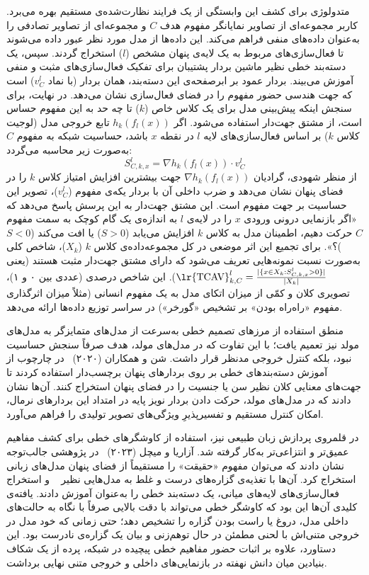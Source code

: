 متدولوژی  برای کشف این وابستگی از یک فرایند نظارت‌شده‌ی مستقیم بهره می‌برد. کاربر مجموعه‌ای از تصاویر نمایانگر مفهوم هدف $C$ و مجموعه‌ای از تصاویر تصادفی را به‌عنوان داده‌های منفی فراهم می‌کند. این داده‌ها از مدل مورد نظر عبور داده می‌شوند تا فعال‌سازی‌های مربوط به یک لایه‌ی پنهان مشخص ($l$) استخراج گردند. سپس، یک دسته‌بند خطی نظیر ماشین بردار پشتیبان برای تفکیک فعال‌سازی‌های مثبت و منفی آموزش می‌بیند. بردار عمود بر ابرصفحه‌ی این دسته‌بند، همان بردار  (با نماد $v_C^l$) است که جهت هندسی حضور مفهوم را در فضای فعال‌سازی نشان می‌دهد. در نهایت، برای سنجش اینکه پیش‌بینی مدل برای یک کلاس خاص ($k$) تا چه حد به این مفهوم حساس است، از مشتق جهت‌دار استفاده می‌شود. اگر $h_k(f_l(x))$ تابع خروجی مدل (لوجیت کلاس $k$) بر اساس فعال‌سازی‌های لایه $l$ در نقطه $x$ باشد، حساسیت شبکه به مفهوم $C$ به‌صورت زیر محاسبه می‌گردد:
\begin{equation}\label{eq:chap3_tcav}
    S_{C,k,x}^l = \nabla h_k(f_l(x)) \cdot v_C^l
\end{equation}
از منظر شهودی، گرادیان $\nabla h_k(f_l(x))$ جهت بیشترین افزایش امتیاز کلاس $k$ را در فضای پنهان نشان می‌دهد و ضرب داخلی آن با بردار یکه‌ی مفهوم ($v_C^l$)، تصویر این حساسیت بر جهت مفهوم است. این مشتق جهت‌دار به این پرسش پاسخ می‌دهد که «اگر بازنمایی درونی ورودی $x$ را در لایه‌ی $l$ به اندازه‌ی یک گام کوچک به سمت مفهوم $C$ حرکت دهیم، اطمینان مدل به کلاس $k$ افزایش می‌یابد ($S > 0$) یا افت می‌کند ($S < 0$)؟». برای تجمیع این اثر موضعی در کل مجموعه‌داده‌ی کلاس $k$ ($X_k$)، شاخص کلی  به‌صورت نسبت نمونه‌هایی تعریف می‌شود که دارای مشتق جهت‌دار مثبت هستند (یعنی $\text{\lr{TCAV}}_{k,C}^l = \frac{|\{x \in X_k : S_{C,k,x}^l > 0\}|}{|X_k|}$). این شاخص درصدی (عددی بین ۰ و ۱)، تصویری کلان و کمّی از میزان اتکای مدل به یک مفهوم انسانی (مثلاً میزان اثرگذاری مفهوم «راه‌راه بودن» بر تشخیص «گورخر») در سراسر توزیع داده‌ها ارائه می‌دهد.

منطق استفاده از مرزهای تصمیم خطی به‌سرعت از مدل‌های متمایزگر به مدل‌های مولد نیز تعمیم یافت؛ با این تفاوت که در مدل‌های مولد، هدف صرفاً سنجش حساسیت نبود، بلکه کنترل خروجی مدنظر قرار داشت. شن و همکاران (۲۰۲۰)~\cite{shen2020interpreting} در چارچوب  از آموزش دسته‌بندهای خطی بر روی بردارهای پنهان برچسب‌دار استفاده کردند تا جهت‌های معنایی کلان نظیر سن یا جنسیت را در فضای پنهان استخراج کنند. آن‌ها نشان دادند که در مدل‌های مولد، حرکت دادن بردار نویز پایه در امتداد این بردارهای نرمال، امکان کنترل مستقیم و تفسیرپذیرِ ویژگی‌های تصویر تولیدی را فراهم می‌آورد.

در قلمروی پردازش زبان طبیعی نیز، استفاده از کاوشگرهای خطی برای کشف مفاهیم عمیق‌تر و انتزاعی‌تر به‌کار گرفته شد. آزاریا و میچل (۲۰۲۳)~\cite{azaria2023theinternal} در پژوهشی جالب‌توجه نشان دادند که می‌توان مفهوم «حقیقت» را مستقیماً از فضای پنهان مدل‌های زبانی استخراج کرد. آن‌ها با تغذیه‌ی گزاره‌های درست و غلط به مدل‌هایی نظیر ~\cite{touvron2023llama} و استخراج فعال‌سازی‌های لایه‌های میانی، یک دسته‌بند خطی را به‌عنوان  آموزش دادند. یافته‌ی کلیدی آن‌ها این بود که کاوشگر خطی می‌تواند با دقت بالایی صرفاً با نگاه به حالت‌های داخلی مدل، دروغ یا راست بودن گزاره را تشخیص دهد؛ حتی زمانی که خود مدل در خروجی متنی‌اش با لحنی مطمئن در حال توهم‌زنی و بیان یک گزاره‌ی نادرست بود. این دستاورد، علاوه بر اثبات حضور مفاهیم خطی پیچیده در شبکه، پرده از یک شکاف بنیادین میان دانش نهفته در بازنمایی‌های داخلی و خروجی متنی نهایی برداشت.

